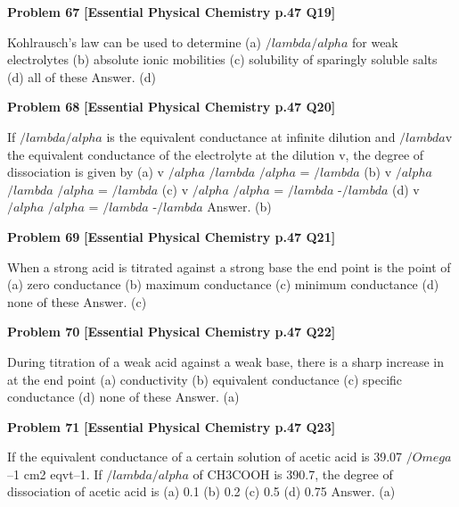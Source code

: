 \begin{problembox}
\textbf{Problem 67} \hfill \textbf{[Essential Physical Chemistry p.47 Q19]}
\label{q:ext-essential_all_questions-67}

Kohlrausch's law can be used to determine
(a)
$/lambda$$/alpha$ for weak electrolytes
(b)
absolute ionic mobilities
(c)
solubility of sparingly soluble salts
(d)
all of these
Answer. (d)
\end{problembox}

\begin{problembox}
\textbf{Problem 68} \hfill \textbf{[Essential Physical Chemistry p.47 Q20]}
\label{q:ext-essential_all_questions-68}

If $/lambda$$/alpha$ is the equivalent conductance at infinite dilution and $/lambda$v the equivalent conductance of the electrolyte
at the dilution v, the degree of dissociation is given by
(a)
v
$/alpha$
$/lambda$
$/alpha$ = $/lambda$
(b)
v
$/alpha$
$/lambda$
$/alpha$ = $/lambda$
(c)
v
$/alpha$
$/alpha$ = $/lambda$ -$/lambda$
(d)
v
$/alpha$
$/alpha$ = $/lambda$ -$/lambda$
Answer. (b)
\end{problembox}

\begin{problembox}
\textbf{Problem 69} \hfill \textbf{[Essential Physical Chemistry p.47 Q21]}
\label{q:ext-essential_all_questions-69}

When a strong acid is titrated against a strong base the end point is the point of
(a)
zero conductance
(b)
maximum conductance
(c)
minimum conductance
(d)
none of these
Answer. (c)
\end{problembox}

\begin{problembox}
\textbf{Problem 70} \hfill \textbf{[Essential Physical Chemistry p.47 Q22]}
\label{q:ext-essential_all_questions-70}

During titration of a weak acid against a weak base, there is a sharp increase in \underline{\hspace{1cm}} at the end point
(a)
conductivity
(b)
equivalent conductance
(c)
specific conductance
(d)
none of these
Answer. (a)
\end{problembox}

\begin{problembox}
\textbf{Problem 71} \hfill \textbf{[Essential Physical Chemistry p.47 Q23]}
\label{q:ext-essential_all_questions-71}

If the equivalent conductance of a certain solution of acetic acid is 39.07 $/Omega$--1 cm2 eqvt--1. If $/lambda$$/alpha$ of
CH3COOH is 390.7, the degree of dissociation of acetic acid is
(a)
0.1
(b)
0.2
(c)
0.5
(d)
0.75
Answer. (a)
\end{problembox}

